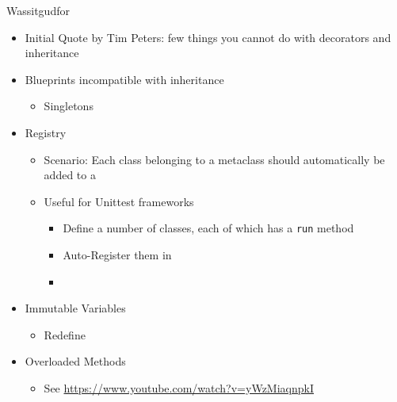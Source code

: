 
\begin{frame}{Wassitgudfor}
%
\begin{itemize}
\item Initial Quote by Tim Peters: few things you cannot do with decorators and inheritance
\item Blueprints incompatible with inheritance
	\begin{itemize}
	\item Singletons
	\end{itemize}
\item Registry
	\begin{itemize}
	\item Scenario: Each class belonging to a metaclass should automatically be added to a 
	\item Useful for Unittest frameworks
		\begin{itemize}
		\item Define a number of classes, each of which has a \texttt{run} method
		\item Auto-Register them in 
		\item {}
		\end{itemize}
	\end{itemize}
\item Immutable Variables
	\begin{itemize}
	\item Redefine 
	\end{itemize}
\item Overloaded Methods
	\begin{itemize}
	\item See \url{https://www.youtube.com/watch?v=yWzMiaqnpkI}
	\end{itemize}
\end{itemize}
%
\end{frame}

